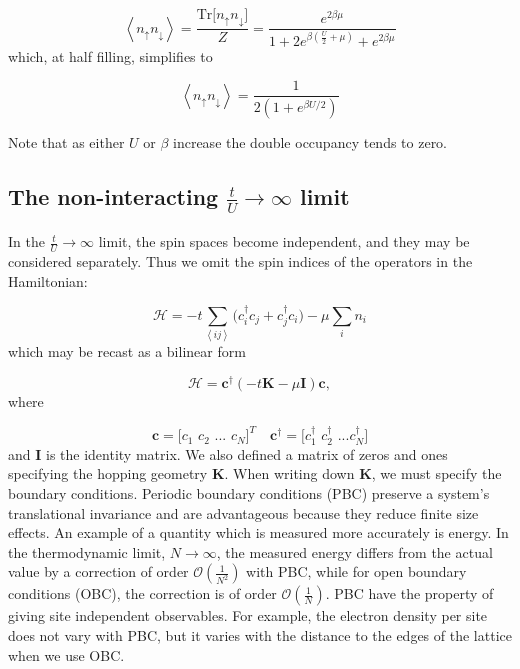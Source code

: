 \documentclass[10pt, twocolumn, twoside]{article}
\begin{document}
\begin{enumerate}
\begin{equation}
\left\langle n_\uparrow n_\downarrow \right\rangle = \frac{\text{Tr} \big[ n_\uparrow n_\downarrow \big]}{Z} = \frac{e^{2\beta\mu}}{1 + 2 e^{\beta (\frac{U}{2} + \mu )} + e^{2\beta\mu}}
\end{equation}
which, at half filling, simplifies to

\begin{equation}
\left\langle n_\uparrow n_\downarrow \right\rangle = \frac{1}{2 ( 1 + e^{\beta U/2} )}
\end{equation}

Note that as either $U$ or $\beta$ increase the double occupancy tends to zero.
\end{enumerate}

\subsection{The non-interacting $\frac{t}{U} \rightarrow \infty$ limit}\paragraph{}

In the $\frac{t}{U} \rightarrow \infty$ limit, the spin spaces become independent, and they may be considered separately. Thus we omit the spin indices of the operators in the Hamiltonian:

\begin{equation}
\mathcal{H} = -t \sum_{\left\langle i j \right\rangle} \big( c_i^\dagger c_j + c_j^\dagger c_i \big) - \mu \sum_i n_i
\end{equation}
which may be recast as a bilinear form

\begin{equation}
\mathcal{H} = \bm c^\dagger ( -t \bm K - \mu \bm I ) \bm c ,
\end{equation}
where

\begin{equation}
\bm c = \bigg[ c_1 \,\, c_2 \,\, ... \,\, c_N \bigg]^T \quad \bm c^\dagger = \bigg[c_1^\dagger \,\, c_2^\dagger \,\, ... c_N^\dagger \bigg]
\end{equation}
and $\bm I$ is the identity matrix. We also defined a matrix of zeros and ones specifying the hopping geometry $\bm K$. When writing down $\bm K$, we must specify the boundary conditions. Periodic boundary conditions (PBC) preserve a system's translational invariance and are advantageous because they reduce finite size effects. An example of a quantity which is measured more accurately is energy. In the thermodynamic limit, $N \rightarrow \infty$, the measured energy differs from the actual value by a correction of order $\mathcal{O}(\frac{1}{N^2})$ with PBC, while for open boundary conditions (OBC), the correction is of order $\mathcal{O}(\frac{1}{N})$. PBC have the property of giving site independent observables. For example, the electron density per site does not vary with PBC, but it varies with the distance to the edges of the lattice when we use OBC.
\end{document}
